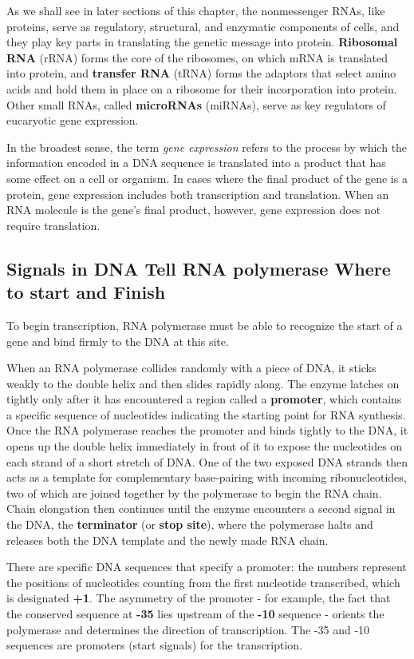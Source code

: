 As we shall see in later sections of this chapter, the nonmessenger RNAs,
like proteins, serve as regulatory, structural, and enzymatic components
of cells, and they play key parts in translating the genetic message into
protein. \textbf{Ribosomal RNA} (rRNA) forms the core of the ribosomes, on which
mRNA is translated into protein, and \textbf{transfer RNA} (tRNA) forms the adaptors
that select amino acids and hold them in place on a ribosome for
their incorporation into protein. Other small RNAs, called \textbf{microRNAs}
(miRNAs), serve as key regulators of eucaryotic gene expression.

In the broadest sense, the term \textit{gene expression} refers to the process
by which the information encoded in a DNA sequence is translated into
a product that has some effect on a cell or organism. In cases where
the final product of the gene is a protein, gene expression includes both
transcription and translation. When an RNA molecule is the gene’s final
product, however, gene expression does not require translation.

\subsection{Signals in DNA Tell RNA polymerase Where to start and Finish}

To begin transcription, RNA polymerase must be able to recognize the start of
a gene and bind firmly to the DNA at this site.

When an RNA polymerase collides randomly with a piece of DNA,
it sticks weakly to the double helix and then slides rapidly along. The
enzyme latches on tightly only after it has encountered a region called a
\textbf{promoter}, which contains a specific sequence of nucleotides indicating
the starting point for RNA synthesis. Once the RNA polymerase reaches
the promoter and binds tightly to the DNA, it opens up the double helix
immediately in front of it to expose the nucleotides on each strand of a
short stretch of DNA. One of the two exposed DNA strands
then acts as a template for complementary base-pairing with incoming
ribonucleotides, two of which are joined together by the polymerase to
begin the RNA chain. Chain elongation then continues until the enzyme
encounters a second signal in the DNA, the \textbf{terminator} (or \textbf{stop site}),
where the polymerase halts and releases both the DNA template and the
newly made RNA chain.

There are specific DNA sequences that specify a promoter: the numbers represent the positions
of nucleotides counting from the first nucleotide transcribed, which is designated 
\textbf{+1}. The asymmetry of the promoter - for example, the fact that the conserved
sequence at \textbf{-35} lies upstream of the \textbf{-10} sequence - orients the polymerase and
determines the direction of transcription. The -35 and -10 sequences are promoters (start signals) 
for the transcription.

